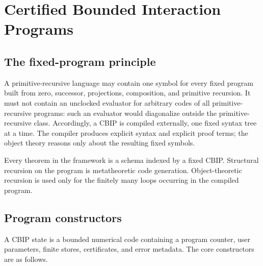 \section{Certified Bounded Interaction Programs}\label{sec:cbip}

\subsection{The fixed-program principle}

A primitive-recursive language may contain one symbol for every fixed program built from zero, successor, projections, composition, and primitive recursion.  It must not contain an unclocked evaluator for arbitrary codes of all primitive-recursive programs: such an evaluator would diagonalize outside the primitive-recursive class.  Accordingly, a CBIP is compiled externally, one fixed syntax tree at a time.  The compiler produces explicit  syntax and explicit proof terms; the object theory reasons only about the resulting fixed symbols.

\begin{principle}
Every theorem in the framework is a schema indexed by a fixed CBIP.  Structural recursion on the program is metatheoretic code generation.  Object-theoretic recursion is used only for the finitely many loops occurring in the compiled program.
\end{principle}

\subsection{Program constructors}

A CBIP state is a bounded numerical code containing a program counter, user parameters, finite stores, certificates, and error metadata.  The core constructors are as follows.

